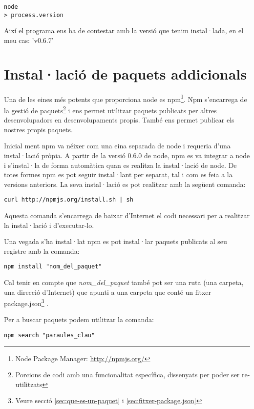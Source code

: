 \begin{verbatim}
node
> process.version
\end{verbatim}

Així el programa ens ha de contestar amb la versió que tenim instal·lada, en el meu cas: 'v0.6.7'

\section{Instal·lació de paquets addicionals}
\label{sec:paquets-adicionals}
Una de les eines més potents que proporciona node es npm\footnote{Node Package Manager: \url{http://npmjs.org/}}.
Npm s'encarrega de la gestió de paquets\footnote{Porcions de codi amb una funcionalitat específica, dissenyats per poder ser re-utilitzats} i ens permet utilitzar paquets publicats per altres desenvolupadors en desenvolupaments propis. També ens permet publicar els nostres propis paquets. 

Inicial ment npm va néixer com una eina separada de node i requeria d'una instal·lació pròpia. A partir de la versió 0.6.0 de node, npm es va integrar a node i s'instal·la de forma automàtica quan es realitza la instal·lació de node. De totes formes npm es pot seguir instal·lant per separat, tal i com es feia a la versions anteriors. La seva instal·lació es pot realitzar amb la següent comanda:

\begin{verbatim}
curl http://npmjs.org/install.sh | sh
\end{verbatim}

Aquesta comanda s'encarrega de baixar d'Internet el codi necessari per a realitzar la instal·lació i d'executar-lo. 

Una vegada s'ha instal·lat npm es pot instal·lar paquets publicats al seu registre amb la comanda:

\begin{verbatim}
npm install "nom_del_paquet"
\end{verbatim}

Cal tenir en compte que \emph{nom\_del\_paquet} també pot ser una ruta (una carpeta, una direcció d'Internet) que apunti a una carpeta que conté un fitxer package.json\footnote{Veure secció \ref{sec:que-es-un-paquet} i \ref{sec:fitxer-package.json}} . 

Per a buscar paquets podem utilitzar la comanda: 

\begin{verbatim}
npm search "paraules_clau"
\end{verbatim}

